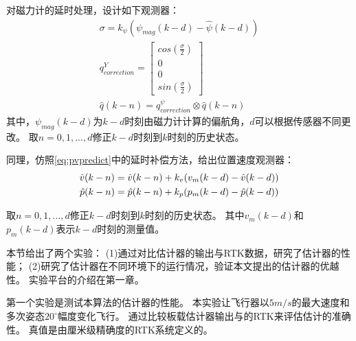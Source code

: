 \documentclass[
  type=master
]{gdutthesis}
\begin{document}
对磁力计的延时处理，设计如下观测器：\vspace{1ex}
\begin{gather}\label{eq:myyawcorrection}
		\sigma = k_{\psi} (\psi_{mag}(k-d) - \hat{\psi}(k-d)) \\
		q_{correction}^{Y} = \begin{bmatrix}
			cos(\frac{\sigma}{2}) \\
			0 \\
			0 \\
			sin(\frac{\sigma}{2})
		\end{bmatrix}\\
		\hat{q}(k-n) = q_{correction}^{\psi} \otimes \hat{q}(k-n)
\end{gather}
其中，$\psi_{mag}(k-d)$为$k-d$时刻由磁力计计算的偏航角，$d$可以根据传感器不同更改。
取$n=0,1,...,d$修正$k-d$时刻到$k$时刻的历史状态。

同理，仿照\autoref{eq:pvpredict}中的延时补偿方法，给出位置速度观测器：\vspace{1ex}
\begin{gather}\label{eq:mypvcorrection}
		\hat{v}(k-n) = \hat{v}(k-n) + k_v (v_m(k-d) - \hat{v}(k-d))\\
		\hat{p}(k-n) = \hat{p}(k-n) + k_p (p_m(k-d) - \hat{p}(k-d))\vspace{1ex}
\end{gather}
取$n=0,1,...,d$修正$k-d$时刻到$k$时刻的历史状态。
其中$v_m(k-d)$和$p_m(k-d)$表示$k-d$时刻的测量值。

本节给出了两个实验：
(1)通过对比估计器的输出与RTK数据，研究了估计器的性能；
(2)研究了估计器在不同环境下的运行情况，验证本文提出的估计器的优越性。
实验平台的介绍在第一章。

第一个实验是测试本算法的估计器的性能。
本实验让飞行器以$5m/s$的最大速度和多次姿态$20^{\circ}$幅度变化飞行。
通过比较板载估计器输出与的RTK来评估估计的准确性。
真值是由厘米级精确度的RTK系统定义的。
\end{document}

